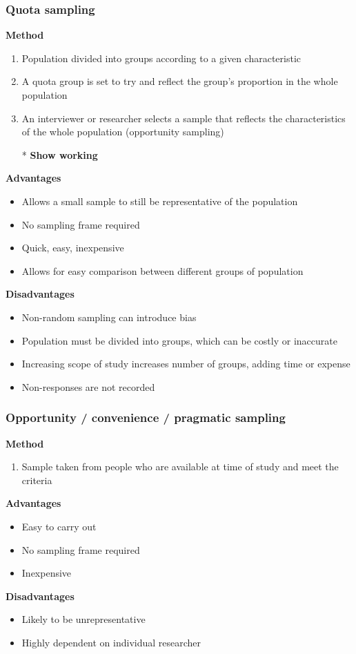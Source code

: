 \documentclass[fleqn, 11pt]{article}
\begin{document}
	\subsubsection{Quota sampling}
	\textbf{Method}
	\begin{enumerate}
		\item Population divided into groups according to a given characteristic
		\item A quota group is set to try and reflect the group's proportion in the whole population
		\item An interviewer or researcher selects a sample that reflects the characteristics of the whole population (opportunity sampling)
		\item[*] \textbf{Show working}
	\end{enumerate}
	\textbf{Advantages}
	\begin{itemize}
		\item Allows a small sample to still be representative of the population
		\item No sampling frame required
		\item Quick, easy, inexpensive
		\item Allows for easy comparison between different groups of population
	\end{itemize}
	\textbf{Disadvantages}
	\begin{itemize}
		\item Non-random sampling can introduce bias
		\item Population must be divided into groups, which can be costly or inaccurate
		\item Increasing scope of study increases number of groups, adding time or expense
		\item Non-responses are not recorded
	\end{itemize}
	
	\subsubsection{Opportunity / convenience / pragmatic sampling}
	\textbf{Method}
	\begin{enumerate}
		\item Sample taken from people who are available at time of study and meet the criteria
	\end{enumerate}
	\textbf{Advantages}
	\begin{itemize}
		\item Easy to carry out
		\item No sampling frame required
		\item Inexpensive
	\end{itemize}
	\textbf{Disadvantages}
	\begin{itemize}
		\item Likely to be unrepresentative
		\item Highly dependent on individual researcher
	\end{itemize}
	
\end{document}
